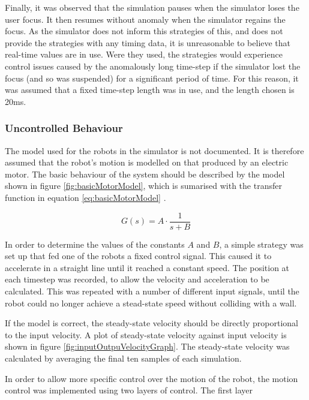 \documentclass[10pt]{article}
\begin{document}
Finally, it was observed that the simulation pauses when the simulator loses the user focus.  It then resumes without anomaly when the simulator regains the focus.  As the simulator does not inform this strategies of this, and does not provide the strategies with any timing data, it is unreasonable to believe that real-time values are in use.  Were they used, the strategies would experience control issues caused by the anomalously long time-step if the simulator lost the focus (and so was suspended) for a significant period of time.  For this reason, it was assumed that a fixed time-step length was in use, and the length chosen is 20ms.

\subsubsection{Uncontrolled Behaviour}

The model used for the robots in the simulator is not documented. It is therefore assumed that the robot's motion is modelled on that produced by an electric motor. The basic behaviour of the system should be described by the model shown in figure \ref{fig:basicMotorModel}, which is sumarised with the transfer function in equation \ref{eq:basicMotorModel} \cite{basicControlNotes}.

\begin{equation}
 \label{eq:basicMotorModel}
 G\left(s\right) = A \cdot \frac{1}{s+B}
\end{equation}

In order to determine the values of the constants $A$ and $B$, a simple strategy was set up that fed one of the robots a fixed control signal.  This caused it to accelerate in a straight line until it reached a constant speed.  The position at each timestep was recorded, to allow the velocity and acceleration to be calculated.  This was repeated with a number of different input signals, until the robot could no longer achieve a stead-state speed without colliding with a wall.

If the model is correct, the steady-state velocity should be directly proportional to the input velocity.  A plot of steady-state velocity against input velocity is shown in figure \ref{fig:inputOutpuVelocityGraph}.  The steady-state velocity was calculated by averaging the final ten samples of each simulation.

In order to allow more specific control over the motion of the robot, the motion control was implemented using two layers of control.  The first layer
\end{document}
